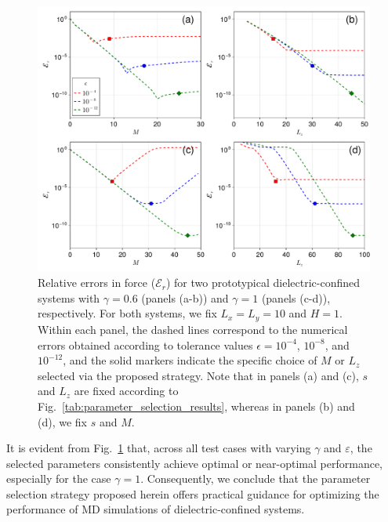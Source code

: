 \begin{figure}[htbp]
    \centering
    \includegraphics[width=0.92\linewidth]{figs/error_parameter_selection_force.pdf}
    \caption{
        Relative errors in force ($\mathcal{E}_r$) for two prototypical dielectric-confined systems with $\gamma=0.6$ (panels (a-b)) and $\gamma = 1$ (panels (c-d)), respectively.
        For both systems, we fix $L_x=L_y=10$ and $H = 1$. 
        Within each panel, the dashed lines correspond to the numerical errors obtained according to tolerance values $\epsilon = 10^{-4}$, $10^{-8}$, and $10^{-12}$, and the solid markers indicate the specific choice of $M$ or $L_z$ selected via the proposed strategy.
        Note that in panels (a) and (c), $s$ and $L_z$ are fixed according to Fig.~\ref{tab:parameter_selection_results}, whereas in panels (b) and (d), we fix $s$ and $M$.
    }
    \label{fig:error_parameter_selection_force}
\end{figure}
It is evident from Fig.~\ref{fig:error_parameter_selection_force} that, across all test cases with varying $\gamma$ and $\varepsilon$, the selected parameters consistently achieve optimal or near-optimal performance, especially for the case $\gamma = 1$. 
Consequently, we conclude that the parameter selection strategy proposed herein offers practical guidance for optimizing the performance of MD simulations of dielectric-confined systems.
